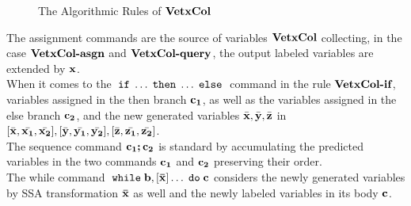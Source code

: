 \begin{figure}
{
}
\caption{The Algorithmic Rules of $\bf{VetxCol}$ }
\label{fig:var_col}
\end{figure}
%
%
The assignment commands are the source of variables $\bf{VetxCol}$ collecting, 
in the case $\textbf{\bf{VetxCol}-asgn}$ and $\textbf{\bf{VetxCol}-query}$, 
the output labeled variables are extended by ${\boldsymbol{\mathbf{x}}}$. 
\\
When it comes to the $\;\mathtt{if}\; \ldots \mathtt{\;then\;} \ldots \mathtt{\;else\;}$ command in the rule $\textbf{\bf{VetxCol}-if}$, variables assigned in the then branch ${\boldsymbol{\mathbf{c_1}}}$, as well as the variables assigned in the else branch ${\boldsymbol{\mathbf{c_2}}}$, and the new generated variables $\bar{{\boldsymbol{\mathbf{x}}}},\bar{{\boldsymbol{\mathbf{y}}}},\bar{{\boldsymbol{\mathbf{z}}}}$ in $ [ \bar{{\boldsymbol{\mathbf{x}}}}, \bar{{\boldsymbol{\mathbf{x_1}}}}, \bar{{\boldsymbol{\mathbf{x_2}}}}] ,[ \bar{{\boldsymbol{\mathbf{y}}}}, \bar{{\boldsymbol{\mathbf{y_1}}}}, \bar{{\boldsymbol{\mathbf{y_2}}}}],[ \bar{{\boldsymbol{\mathbf{z}}}}, \bar{{\boldsymbol{\mathbf{z_1}}}}, \bar{{\boldsymbol{\mathbf{z_2}}}}]$.
\\ 
The sequence command ${\boldsymbol{\mathbf{c_1;c_2}}}$ is standard by accumulating the predicted variables in the two commands ${\boldsymbol{\mathbf{c_1}}}$ and ${\boldsymbol{\mathbf{c_2}}}$ preserving their order. 
\\
The while command $\;\mathtt{while}\; {\boldsymbol{\mathbf{b}}}, [{\boldsymbol{\mathbf{\bar{x}}}}] \ldots \;\mathtt{do}\; {\boldsymbol{\mathbf{c}}}$ considers the newly generated variables by SSA transformation ${\boldsymbol{\mathbf{\bar{x}}}}$
as well and the newly labeled variables in its body ${\boldsymbol{\mathbf{c}}}$.

